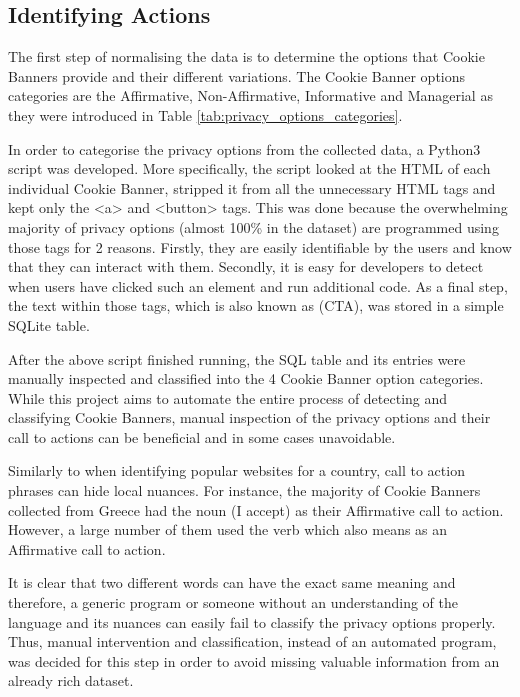 \documentclass[../main.tex]{subfiles}
\begin{document}
\subsection{Identifying Actions}
The first step of normalising the data is to determine the options that Cookie Banners provide and their different variations. The Cookie Banner options categories are the Affirmative, Non-Affirmative, Informative and Managerial as they were introduced in Table \ref{tab:privacy_options_categories}.

In order to categorise the privacy options from the collected data, a Python3 script was developed. More specifically, the script looked at the HTML of each individual Cookie Banner, stripped it from all the unnecessary HTML tags and kept only the {\selectfont <a>} and {\selectfont <button>} tags. This was done because the overwhelming majority of privacy options (almost 100\% in the dataset) are programmed using those tags for 2 reasons. Firstly, they are easily identifiable by the users and know that they can interact with them. Secondly, it is easy for developers to detect when users have clicked such an element and run additional code. As a final step, the text within those tags, which is also known as  (CTA), was stored in a simple SQLite table.

After the above script finished running, the SQL table and its entries were manually inspected and classified into the 4 Cookie Banner option categories. While this project aims to automate the entire process of detecting and classifying Cookie Banners, manual inspection of the privacy options and their call to actions can be beneficial and in some cases unavoidable.

Similarly to when identifying popular websites for a country, call to action phrases can hide local nuances. For instance, the majority of Cookie Banners collected from Greece had the noun  (I accept) as their Affirmative call to action. However, a large number of them used the verb  which also means  as an Affirmative call to action. 

It is clear that two different words can have the exact same meaning and therefore, a generic program or someone without an understanding of the language and its nuances can easily fail to classify the privacy options properly. Thus, manual intervention and classification, instead of an automated program, was decided for this step in order to avoid missing valuable information from an already rich dataset. 
\end{document}
